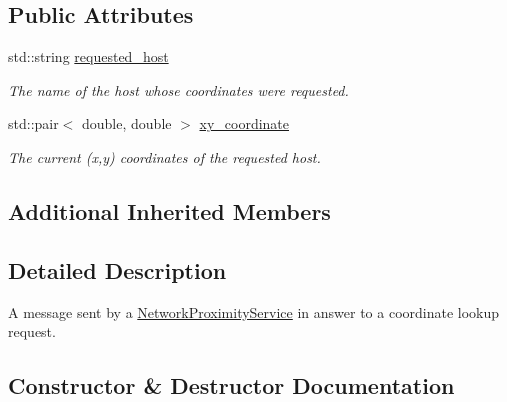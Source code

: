 \subsection*{Public Attributes}
\begin{DoxyCompactItemize}
\item 
\mbox{\label{classwrench_1_1_coordinate_lookup_answer_message_a2df7247a445efa620e8c3a0161109be1}} 
std\+::string \hyperlink{classwrench_1_1_coordinate_lookup_answer_message_a2df7247a445efa620e8c3a0161109be1}{requested\+\_\+host}
\begin{DoxyCompactList}\small\item\em The name of the host whose coordinates were requested. \end{DoxyCompactList}\item 
\mbox{\label{classwrench_1_1_coordinate_lookup_answer_message_acc1e9708cb8c9127d480415ca4d3452e}} 
std\+::pair$<$ double, double $>$ \hyperlink{classwrench_1_1_coordinate_lookup_answer_message_acc1e9708cb8c9127d480415ca4d3452e}{xy\+\_\+coordinate}
\begin{DoxyCompactList}\small\item\em The current (x,y) coordinates of the requested host. \end{DoxyCompactList}\end{DoxyCompactItemize}
\subsection*{Additional Inherited Members}


\subsection{Detailed Description}
A message sent by a \hyperlink{classwrench_1_1_network_proximity_service}{Network\+Proximity\+Service} in answer to a coordinate lookup request. 

\subsection{Constructor \& Destructor Documentation}
\mbox{\label{classwrench_1_1_coordinate_lookup_answer_message_ad32d9253fbb49913d426fa68285fb90f}} 
